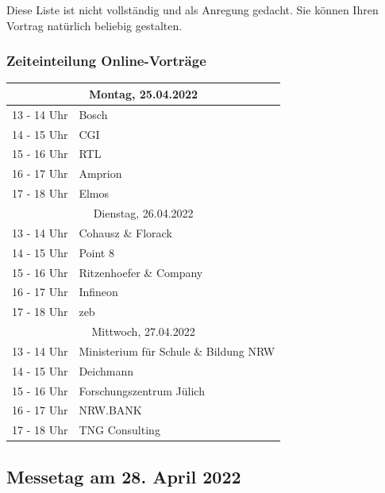 \documentclass[
  paper=a4,
  fontsize=12pt,
  DIV=16,
  headheight=30pt,
  footheight=45pt,
  headinclude,
  parskip=half,
]{scrartcl}
\begin{document}
Diese Liste ist nicht vollständig und als Anregung gedacht.
Sie können Ihren Vortrag natürlich beliebig gestalten.

\subsubsection*{Zeiteinteilung Online-Vorträge}

\begin{table}[htbp]
    \centering
\begin{tabular}{|c|l|}
    \hline
    \multicolumn{2}{|c|}{Montag, 25.04.2022} \\
    \hline
    \rowcolor{gray!10} 13 - 14 Uhr & Bosch \\
    \rowcolor{gray!30} 14 - 15 Uhr & CGI \\
    \rowcolor{gray!10} 15 ­- 16 Uhr & RTL \\
    \rowcolor{gray!30} 16 - 17 Uhr & Amprion\\
    \rowcolor{gray!10} 17 ­- 18 Uhr & Elmos \\
    \hline
    \multicolumn{2}{|c|}{Dienstag, 26.04.2022} \\
    \hline
    \rowcolor{gray!10} 13 - 14 Uhr & Cohausz \& Florack \\
    \rowcolor{gray!30} 14 - 15 Uhr & Point 8 \\
    \rowcolor{gray!10} 15 ­- 16 Uhr & Ritzenhoefer \& Company \\
    \rowcolor{gray!30} 16 - 17 Uhr & Infineon \\
    \rowcolor{gray!10} 17 ­- 18 Uhr & zeb \\
    \hline
    \multicolumn{2}{|c|}{Mittwoch, 27.04.2022} \\
    \hline
    \rowcolor{gray!10} 13 - 14 Uhr & Ministerium für Schule \& Bildung NRW \\
    \rowcolor{gray!30} 14 - 15 Uhr & Deichmann \\
    \rowcolor{gray!10} 15 ­- 16 Uhr & Forschungszentrum Jülich \\
    \rowcolor{gray!30} 16 - 17 Uhr & NRW.BANK\\
    \rowcolor{gray!10} 17 ­- 18 Uhr & TNG Consulting \\
    \hline
    \end{tabular}

\end{table}


\subsection*{Messetag am 28. April 2022}
\end{document}
